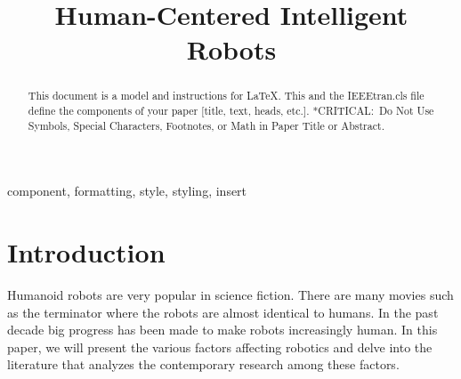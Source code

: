\documentclass[conference]{IEEEtran}
\begin{document}
\title{Human-Centered Intelligent Robots\\
}

\author{
\and
{}
}

\maketitle

\begin{abstract}
This document is a model and instructions for \LaTeX.
This and the IEEEtran.cls file define the components of your paper [title, text, heads, etc.]. *CRITICAL:\ Do Not Use Symbols, Special Characters, Footnotes, 
or Math in Paper Title or Abstract.
\end{abstract}

\begin{IEEEkeywords}
component, formatting, style, styling, insert
\end{IEEEkeywords}

\section{Introduction}
Humanoid robots are very popular in science fiction. There are many movies such as the terminator where the robots are almost identical to humans. In the past decade big progress has been made to make robots increasingly human. In this paper, we will present the various factors affecting robotics and delve into the literature that analyzes the contemporary research among these factors.
\end{document}
